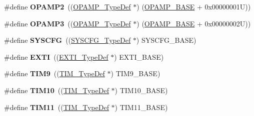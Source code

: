 \begin{DoxyCompactItemize}
\item 
\hypertarget{group___peripheral__declaration_gabc11c296d6d15ca861b6378bc056848e}{\#define {\bfseries O\-P\-A\-M\-P2}~((\hyperlink{struct_o_p_a_m_p___type_def}{O\-P\-A\-M\-P\-\_\-\-Type\-Def} $\ast$) (\hyperlink{group___peripheral__memory__map_ga6e9722d15c7ed794f0eca9682f64c03c}{O\-P\-A\-M\-P\-\_\-\-B\-A\-S\-E} + 0x00000001\-U))}\label{group___peripheral__declaration_gabc11c296d6d15ca861b6378bc056848e}

\item 
\hypertarget{group___peripheral__declaration_ga50369700b1093ec17ad8d1835223b1e0}{\#define {\bfseries O\-P\-A\-M\-P3}~((\hyperlink{struct_o_p_a_m_p___type_def}{O\-P\-A\-M\-P\-\_\-\-Type\-Def} $\ast$) (\hyperlink{group___peripheral__memory__map_ga6e9722d15c7ed794f0eca9682f64c03c}{O\-P\-A\-M\-P\-\_\-\-B\-A\-S\-E} + 0x00000002\-U))}\label{group___peripheral__declaration_ga50369700b1093ec17ad8d1835223b1e0}

\item 
\hypertarget{group___peripheral__declaration_ga3c833fe1c486cb62250ccbca32899cb8}{\#define {\bfseries S\-Y\-S\-C\-F\-G}~((\hyperlink{struct_s_y_s_c_f_g___type_def}{S\-Y\-S\-C\-F\-G\-\_\-\-Type\-Def} $\ast$) S\-Y\-S\-C\-F\-G\-\_\-\-B\-A\-S\-E)}\label{group___peripheral__declaration_ga3c833fe1c486cb62250ccbca32899cb8}

\item 
\hypertarget{group___peripheral__declaration_ga9189e770cd9b63dadd36683eb9843cac}{\#define {\bfseries E\-X\-T\-I}~((\hyperlink{struct_e_x_t_i___type_def}{E\-X\-T\-I\-\_\-\-Type\-Def} $\ast$) E\-X\-T\-I\-\_\-\-B\-A\-S\-E)}\label{group___peripheral__declaration_ga9189e770cd9b63dadd36683eb9843cac}

\item 
\hypertarget{group___peripheral__declaration_gaf52b4b4c36110a0addfa98059f54a50e}{\#define {\bfseries T\-I\-M9}~((\hyperlink{struct_t_i_m___type_def}{T\-I\-M\-\_\-\-Type\-Def} $\ast$) T\-I\-M9\-\_\-\-B\-A\-S\-E)}\label{group___peripheral__declaration_gaf52b4b4c36110a0addfa98059f54a50e}

\item 
\hypertarget{group___peripheral__declaration_ga46b2ad3f5f506f0f8df0d2ec3e767267}{\#define {\bfseries T\-I\-M10}~((\hyperlink{struct_t_i_m___type_def}{T\-I\-M\-\_\-\-Type\-Def} $\ast$) T\-I\-M10\-\_\-\-B\-A\-S\-E)}\label{group___peripheral__declaration_ga46b2ad3f5f506f0f8df0d2ec3e767267}

\item 
\hypertarget{group___peripheral__declaration_gacfd11ef966c7165f57e2cebe0abc71ad}{\#define {\bfseries T\-I\-M11}~((\hyperlink{struct_t_i_m___type_def}{T\-I\-M\-\_\-\-Type\-Def} $\ast$) T\-I\-M11\-\_\-\-B\-A\-S\-E)}\label{group___peripheral__declaration_gacfd11ef966c7165f57e2cebe0abc71ad}


\end{DoxyCompactItemize}
